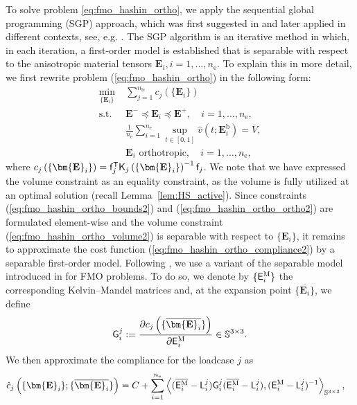 \documentclass[preprint,3p]{elsarticle}
\newcommand{\tensf}[1]{\bm{\mathbf{#1}}}            %
\newcommand{\trn}{\mathsf{T}}                       %
\newcommand{\Ei}{\tensf{E}_i}                       %
\newcommand{\Emin}{\tensf{E}^{-}}                   %
\newcommand{\Emax}{\tensf{E}^{+}}                   %
\newcommand{\nel}{n_\mathrm{e}}                     %
\newcommand{\nlc}{n_\mathrm{lc}}                    %
\newcommand{\semtrx}[1]{\ifcat\noexpand#1\relax\bm{#1}\else\mathsf{#1}\fi}
\newcommand{\sevek}[1]{\ifcat\noexpand#1\relax\bm{#1}\else\mathsf{#1}\fi}
\newcommand{\EiM}{\semtrx{E}_i^\mathrm{M}}          %
\begin{document}
To solve problem \eqref{eq:fmo_hashin_ortho}, we apply the sequential global programming (SGP) approach, which was first suggested in \citep{Semmler-SIAM-2018} and later applied in different contexts, see, e.g. \citep{Nees-SAMO-2023, Vu-SAMO-2023}. The SGP algorithm is an iterative method in which, in each iteration, a first-order model is established that is separable with respect to the anisotropic material tensors $\Ei, i=1,\ldots,\nel$. To explain this in more detail, we first rewrite problem (\ref{eq:fmo_hashin_ortho}) in the following form:
%
\begin{subequations}\label{eq:fmo_hashin_ortho_nested}
\begin{align}
    \min_{\{\Ei\}} \; & \sum_{j=1}^{\nlc} c_j\left(\{\Ei\}\right) \label{eq:fmo_hashin_ortho_compliance2}\\
    \mathrm{s.t.}\; & \Emin \preceq \Ei \preceq \Emax,\quad i = 1,\dots,\nel,\label{eq:fmo_hashin_ortho_bounds2}\\
    & \frac{1}{\nel}\sum_{i=1}^{\nel} \sup_{t \in [0,1]} \hat{v}(t;\Ei^{\mathrm{b}}) = \overline{V},\label{eq:fmo_hashin_ortho_volume2}\\
    & \Ei \text{ orthotropic},\quad i = 1,\dots,\nel,\label{eq:fmo_hashin_ortho_ortho2}
\end{align}
\end{subequations}
%
where $c_j\left(\{\Ei\}\right) = \sevek{f}_j^\trn \semtrx{K}_j\left(\{\Ei\}\right)^{-1}\sevek{f}_j$. We note that we have expressed the volume constraint as an equality constraint, as the volume is fully utilized at an optimal solution (recall Lemma~\ref{lem:HS_active}). Since constraints (\ref{eq:fmo_hashin_ortho_bounds2}) and (\ref{eq:fmo_hashin_ortho_ortho2}) are formulated element-wise and the volume constraint (\ref{eq:fmo_hashin_ortho_volume2}) is separable with respect to $\{\Ei\}$, it remains to approximate the cost function (\ref{eq:fmo_hashin_ortho_compliance2}) by a separable first-order model. Following \citep{Vu-SAMO-2023}, we use a variant of the separable model introduced in \citep{Stingl-SIAM-2009} for FMO problems. To do so, we denote by $\{\EiM\}$ the corresponding Kelvin--Mandel matrices and, at the expansion point $\{\overline{\Ei}\}$, we define
%
\begin{equation}\label{eq:Gij_def}
\semtrx{G}_i^j := \frac{\partial c_j \left(\{\overline{\Ei}\}\right)}{\partial \EiM}\in \mathbb{S}^{3\times3}.
\end{equation}
%
We then approximate the compliance for the loadcase $j$ as
%
\begin{align}
\hat{c}_j\left(\{\Ei\};\{\overline{\Ei}\}\right) & = C + \sum_{i=1}^{\nel} \left\langle (\overline{\EiM} - \semtrx{L}_i^j) \semtrx{G}_i^j (\overline{\EiM} - \semtrx{L}_i^j), (\EiM - \semtrx{L}_i^j)^{-1}\right\rangle_{\mathbb{S}^{3\times3}},
\end{align}
\end{document}
